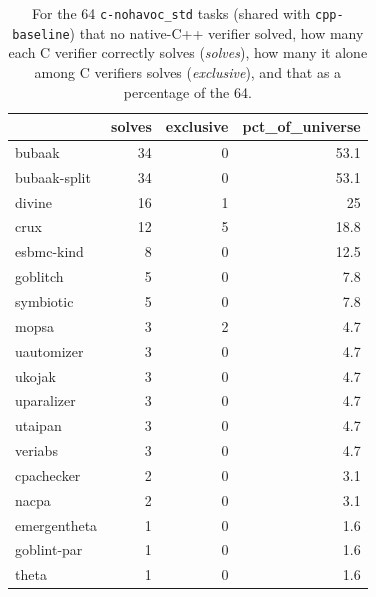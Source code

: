 \begin{table}[t]
  \centering
  \caption{For the 64 \texttt{c-nohavoc_std} tasks (shared with \texttt{cpp-baseline}) that no native-C++ verifier solved, how many each C verifier correctly solves (\emph{solves}), how many it alone among C verifiers solves (\emph{exclusive}), and that as a percentage of the 64.}
  \label{tab:unique-c-breakdown}
\begin{tabular}{lrrr}
\toprule
 & solves & exclusive & pct\_of\_universe \\
\midrule
bubaak & 34 & 0 & 53.1 \\
bubaak-split & 34 & 0 & 53.1 \\
divine & 16 & 1 & 25 \\
crux & 12 & 5 & 18.8 \\
esbmc-kind & 8 & 0 & 12.5 \\
goblitch & 5 & 0 & 7.8 \\
symbiotic & 5 & 0 & 7.8 \\
mopsa & 3 & 2 & 4.7 \\
uautomizer & 3 & 0 & 4.7 \\
ukojak & 3 & 0 & 4.7 \\
uparalizer & 3 & 0 & 4.7 \\
utaipan & 3 & 0 & 4.7 \\
veriabs & 3 & 0 & 4.7 \\
cpachecker & 2 & 0 & 3.1 \\
nacpa & 2 & 0 & 3.1 \\
emergentheta & 1 & 0 & 1.6 \\
goblint-par & 1 & 0 & 1.6 \\
theta & 1 & 0 & 1.6 \\
\bottomrule
\end{tabular}
\end{table}
